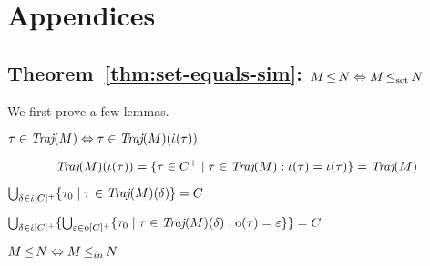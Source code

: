 \section{Appendices}

\subsection{Theorem~\ref{thm:set-equals-sim}: $M \operatorname{\leq} N \Leftrightarrow M \operatorname{\operatorname{\leq}_{\textrm{set}}} N$}

We first prove a few lemmas.

\begin{lemma} \label{lem:traj-part}
$\tau \in \operatorname{\textit{Traj}}(M) \Leftrightarrow \tau \in \operatorname{\textit{Traj}}(M)(\dot{\iota}(\tau))$
\end{lemma}

\begin{equation*}
\operatorname{\textit{Traj}}(M)(\dot{\iota}(\tau)) = \{ \tau \in C^{+} \mid \tau \in \operatorname{\textit{Traj}}(M) : \dot{\iota}(\tau) = \dot{\iota}(\tau) \} = \operatorname{\textit{Traj}}(M)
\end{equation*}

\begin{lemma} \label{lem:traj-all-in}
$\bigcup_{\delta \in \dot{\iota}[C]^{+}} \{ \tau_{0} \mid \tau \in \operatorname{\textit{Traj}}(M)(\delta) \} = C$
\end{lemma}



\begin{lemma} \label{lem:traj-all-out}
$\bigcup_{\delta \in \dot{\iota}[C]^{+}} \{ \bigcup_{\varepsilon \in \mathrm{o}[C]^{+}} \{ \tau_{0} \mid \tau \in \operatorname{\textit{Traj}}(M)(\delta) : \mathrm{o}(\tau) = \varepsilon \} \} = C$
\end{lemma}


\begin{lemma} \label{lem:ref-iff-in}
$M \operatorname{\leq} N \Leftrightarrow M \operatorname{\leq}_{in} N$
\end{lemma}

